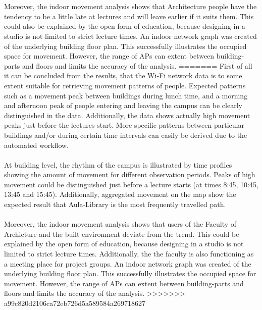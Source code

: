 \\\\
Moreover, the indoor movement analysis shows that Architecture people have the tendency to be a little late at lectures and will leave earlier if it suits them. This could also be explained by the open form of education, because designing in a studio is not limited to strict lecture times. An indoor network graph was created of the underlying building floor plan. This successfully illustrates the occupied space for movement. However, the range of APs can extent between building-parts and floors and limits the accuracy of the analysis.
=======
First of all it can be concluded from the results, that the Wi-Fi network data is to some extent suitable for retrieving movement patterns of people. Expected patterns such as a movement peak between buildings during lunch time, and a morning and afternoon peak of people entering and leaving the campus can be clearly distinguished in the data. Additionally, the data shows actually high movement peaks just before the lectures start. More specific patterns between particular buildings and/or during certain time intervals can easily be derived due to the automated workflow.
\\\\
At building level, the rhythm of the campus is illustrated by time profiles showing the amount of movement for different observation periods. Peaks of high movement could be distinguished just before a lecture starts (at times 8:45, 10:45, 13:45 and 15:45). Additionally, aggregated movement on the map show the expected result that Aula-Library is the most frequently travelled path.
\\\\
Moreover, the indoor movement analysis shows that users of the Faculty of Archicture and the built environment deviate from the trend. This could be explained by the open form of education, because designing in a studio is not limited to strict lecture times. Additionally, the the faculty is also functioning as a meeting place for project groups. An indoor network graph was created of the underlying building floor plan. This successfully illustrates the occupied space for movement. However, the range of APs can extent between building-parts and floors and limits the accuracy of the analysis.
>>>>>>> a99c820d2106ca72eb726d5a589584a269718627

